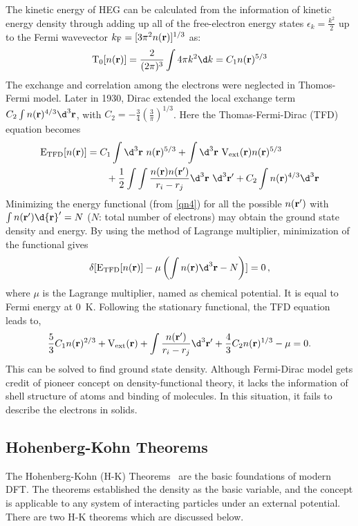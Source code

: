 The kinetic energy of HEG can be calculated from the information of kinetic energy density through adding up all of the free-electron energy states $\epsilon_k = \frac{k^2}{2}$ up to the Fermi wavevector $k_{\rm F} = [3 \pi^2 n({\bf r})]^{1/3} $ as:
\begin{equation*}
{\rm T}_0[n({\bf r})] = \frac{2}{(2\pi)^3} \int 4\pi k^2 \d k  = C_1 n({\bf r})^{5/3}
\end{equation*}
The exchange and correlation among the electrons were neglected in Thomos-Fermi model. Later in 1930, Dirac extended the local exchange term $C_2 \int n({\bf r})^{4/3} \d^3{\bf r}$, with $C_2 = -\frac{3}{4}(\frac{3}{\pi})^{1/3}$. Here the Thomas-Fermi-Dirac (TFD) equation becomes
\begin{align}
{\rm E}_{\text{TFD}}[n({\bf r})] & = C_1 \int\d^3{\bf r}~n({\bf r})^{5/3} + \int\d^3{\bf r}~{\rm V}_{\rm ext}({\bf r}) n({\bf r})^{5/3} \nonumber \\ 
& \qquad {} + \frac{1}{2}\int\int\frac{n({\bf r})n({\bf r'})}{r_{i}-r_{j}} \d^3{\bf r}~\d^3{\bf r'} + C_2 \int n({\bf r})^{4/3} \d^3{\bf r}
\label{qn4}
\end{align}
Minimizing the energy functional (from \ref{qn4}) for all the possible $n({\bf r}')$ with $\int n({\bf r}') \d{\bf r}' = N$ ($N$: total number of electrons) may obtain the ground state density and energy. By using the method of Lagrange multiplier, minimization of the functional gives 
\begin{equation}
\delta [{\rm E}_{\text{TFD}}[n({\bf r})] - \mu \left({\int n({\bf r}) \d^3{\bf r} - N}\right)] = 0\, , 
\end{equation}
where $\mu$ is the Lagrange multiplier, named as chemical potential. It is equal to Fermi energy at 0~K. Following the stationary functional, the TFD equation leads to, 
\begin{equation}
\frac{5}{3} C_1 n({\bf r})^{2/3} + {\rm V}_{\text{ext}}({\bf r}) + \int\frac{n({\bf r'})}{r_{i}-r_{j}} \d^3{\bf r'} + \frac{4}{3} C_2 n({\bf r})^{1/3} - \mu = 0.
\end{equation}
This can be solved to find ground state density. Although Fermi-Dirac model gets credit of pioneer concept on density-functional theory, it lacks the information of shell structure of atoms and binding of molecules. In this situation, it fails to describe the electrons in solids.
\subsection{Hohenberg-Kohn Theorems}
The Hohenberg-Kohn (H-K) Theorems~\citep{Hohenberg1964} are the basic foundations of modern DFT. The theorems established the density as the basic variable, and the concept is applicable to any system of interacting particles under an external potential. There are two H-K theorems which are discussed below.

